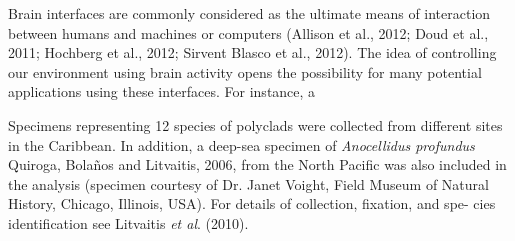 
\begin{multicols}{2}
\par{}Brain interfaces are commonly considered as the
ultimate means of interaction between humans and
machines or computers (Allison et al., 2012; Doud et al.,
2011; Hochberg et al., 2012; Sirvent Blasco et al.,
2012). The idea of controlling our environment using
brain activity opens the possibility for many potential
applications using these interfaces. For instance, a


\lipsum



\par{}Specimens representing 12 species of polyclads were
collected from different sites in the Caribbean. In addition,
a deep-sea specimen of \textit{Anocellidus profundus} Quiroga,
Bolaños and Litvaitis, 2006, from the North Pacific was
also included in the analysis (specimen courtesy of Dr.
Janet Voight, Field Museum of Natural History, Chicago,
Illinois, USA). For details of collection, fixation, and spe-
cies identification see Litvaitis \textit{et al}. (2010).



\end{multicols}
